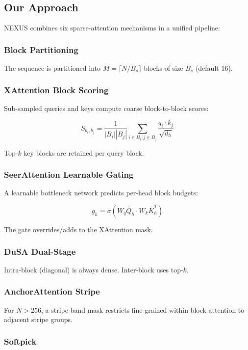 \subsection{Our Approach}

NEXUS combines six sparse-attention mechanisms in a unified pipeline:

\subsubsection{Block Partitioning}

The sequence is partitioned into $M = \lceil N / B_s \rceil$ blocks of size 
$B_s$ (default 16).

\subsubsection{XAttention Block Scoring}

Sub-sampled queries and keys compute coarse block-to-block scores:

\[
S_{b_i, b_j} = \frac{1}{|B_i| |B_j|} \sum_{i \in B_i, j \in B_j} \frac{q_i \cdot k_j}{\sqrt{d_h}}
\tag{1.2}
\]

Top-$k$ key blocks are retained per query block.

\subsubsection{SeerAttention Learnable Gating}

A learnable bottleneck network predicts per-head block budgets:

\[
g_h = \sigma(W_q \bar{Q}_h \cdot W_k \bar{K}_h^T)
\tag{1.3}
\]

The gate overrides/adds to the XAttention mask.

\subsubsection{DuSA Dual-Stage}

Intra-block (diagonal) is always dense. Inter-block uses top-$k$.

\subsubsection{AnchorAttention Stripe}

For $N > 256$, a stripe band mask restricts fine-grained within-block 
attention to adjacent stripe groups.

\subsubsection{Softpick}


